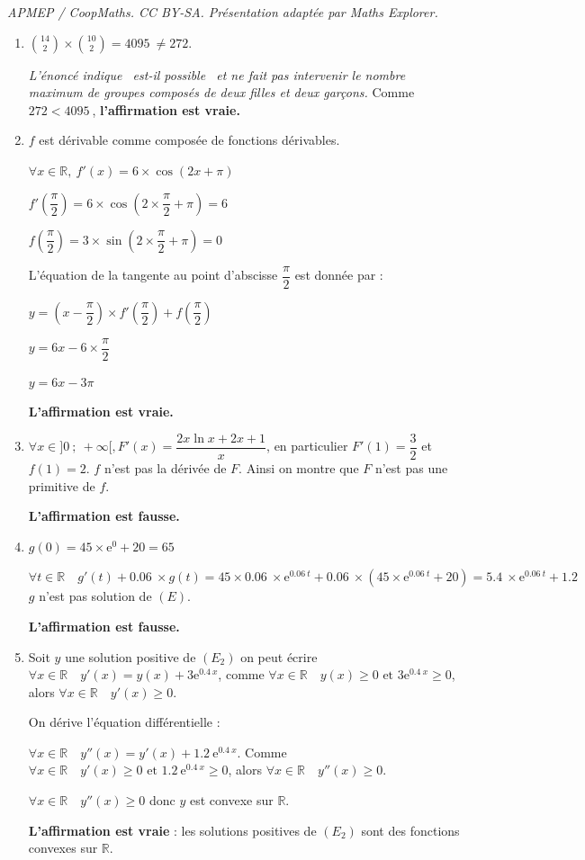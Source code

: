 \documentclass[10pt]{article}
\providecommand{\R}{\mathbb{R}}
\providecommand{\e}{{\mathrm{e}}}
\providecommand{\np}[2][]{{#2~#1}}
\begin{document}
\noindent\textit{APMEP / CoopMaths. CC BY-SA. Présentation adaptée par Maths Explorer.}\par\medskip
\begin{enumerate}
	\item $\binom{14}{2}\times \binom{10}{2} = \np{4095} \neq 272$. 

\emph{L'énoncé indique \og{}~est-il possible~\fg{} et ne fait pas intervenir le nombre maximum de groupes composés de deux filles et deux garçons.
}
Comme $272 < \np{4095}$, \textbf{l'affirmation est vraie.}
	
	\item $f$ est dérivable comme composée de fonctions dérivables. 

$\forall x \in \R,~ f'(x) = 6\times \cos(2x+\pi)$	

$f'\left(\dfrac{\pi}{2}\right) = 6\times \cos\left(2\times\dfrac{\pi}{2} +\pi\right) = 6$

$f\left(\dfrac{\pi}{2}\right) = 3\times \sin\left(2\times\dfrac{\pi}{2} +\pi\right) = 0$
	
	L'équation de la tangente au point d'abscisse $\dfrac{\pi}{2}$ est donnée par :
	
	$y = \left(x - \dfrac{\pi}{2}\right)\times f'\left(\dfrac{\pi}{2}\right) + f\left(\dfrac{\pi}{2}\right)$
	
	$y = 6x- 6\times\dfrac{\pi}{2} $
	
	$y= 6x- 3\pi$
	
	\textbf{L'affirmation est vraie.}
	
	\item $\forall x\in ]0~;~+\infty[, F'(x) = \dfrac{2 x \ln x+2 x+1}{x}$, en particulier $F'(1) = \dfrac{3}{2}$ et $f(1) = 2$. $f$ n'est pas la dérivée de $F$. Ainsi on montre que $F$ n'est pas une primitive de $f$.
	
	\textbf{L'affirmation est fausse.}
	
	\item $g(0) =  45 \times \e^{0} +20 = 65$
	
	$\forall t \in \R\quad g'(t) +\np{0.06}\times g(t) = 45\times \np{0.06}\times \e^{ \np{0.06}t} + \np{0.06}\times\left(45\times\e^{ \np{0.06}t}+20\right) =  \np{5.4}\times\e^{ \np{0.06}t}+\np{1.2}$
	$g$ n'est pas solution de $(E)$.
	
	\textbf{L'affirmation est fausse.}
	
	\item Soit $y$ une solution positive de $\left(E_2\right)$ on peut écrire $\forall x \in \R\quad y'(x) = y(x) + 3\e^{\np{0.4}x}$, comme $\forall x \in \R\quad y(x)\geqslant 0\text{ et } 3\e^{\np{0.4}x}\geqslant 0$, alors  $\forall x \in \R\quad y'(x)\geqslant 0$.
	
	On dérive l'équation différentielle :
	
	$\forall x \in \R\quad y''(x) = y'(x) + \np{1.2}\e^{\np{0.4}x}$. Comme $\forall x \in \R\quad y'(x)\geqslant 0\text{ et } \np{1.2}\e^{\np{0.4}x}\geqslant 0$, alors  $\forall x \in \R\quad y''(x)\geqslant 0$.
	
	$\forall x \in \R\quad y''(x)\geqslant 0$ donc $y$ est convexe sur $\R$.
	
	\textbf{L'affirmation est vraie} : les solutions positives de $\left(E_2\right)$ sont des fonctions convexes sur $\R$.
\end{enumerate}
\end{document}
